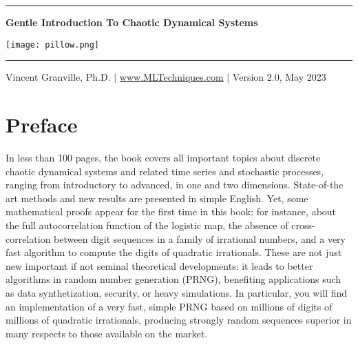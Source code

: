 \documentclass[oneside,10pt]{book}
\begin{document}
\hypersetup{linkcolor=blue}

\baselineskip
\thispagestyle{empty}
\hspace{0pt}
\vfill
\begin{center}
\rule{0.90\textwidth}{.4pt}
\end{center}

\begin{center}
{\Huge \bf{Gentle Introduction To Chaotic Dynamical Systems} }
\end{center}


\baselineskip
\addvspace{2cm}
\begin{center}
\texttt{[image: pillow.png]}
\end{center}
\addvspace{2cm}
\begin{center}
\rule{0.90\textwidth}{.4pt}
\end{center}
\begin{center}
Vincent Granville, Ph.D. $|$ \href{https://mltechniques.com/}{www.MLTechniques.com} $|$ Version 2.0, May 2023
\end{center}

\hypersetup{linkcolor=red} %

\vfill
\hspace{0pt}
\pagebreak

\chapter*{Preface} %

In less than 100 pages, the book covers all important topics about discrete chaotic dynamical systems and
 related time series and stochastic processes, ranging from introductory to advanced, in one and two dimensions. State-of-the art methods and new results are
  presented in simple English. Yet, some mathematical proofs appear for the first time in this book: for instance,
 about the full autocorrelation function of the logistic map, the absence of cross-correlation between digit sequences
  in a family of irrational numbers, and a very fast algorithm to compute the digits of quadratic irrationals. These are not just new important if not seminal theoretical developments: it leads to
 better algorithms in random number generation (PRNG), benefiting applications such as
  data synthetization, security, or heavy simulations. In particular, you will find an implementation of a very fast, simple PRNG based on
 millions of digits of millions of quadratic irrationals, producing strongly random sequences superior in many respects to those available
 on the market.
\end{document}
